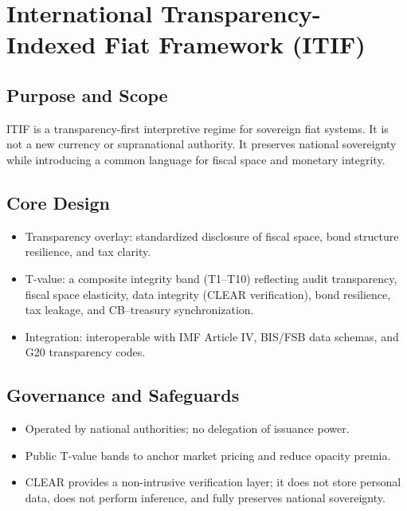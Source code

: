 \section{International Transparency-Indexed Fiat Framework (ITIF)}
\subsection{Purpose and Scope}
ITIF is a transparency-first interpretive regime for sovereign fiat systems. It is not a new currency or supranational authority. It preserves national sovereignty while introducing a common language for fiscal space and monetary integrity.

\subsection{Core Design}
\begin{itemize}
  \item Transparency overlay: standardized disclosure of fiscal space, bond structure resilience, and tax clarity.
  \item T-value: a composite integrity band (T1--T10) reflecting audit transparency, fiscal space elasticity, data integrity (CLEAR verification), bond resilience, tax leakage, and CB--treasury synchronization.
  \item Integration: interoperable with IMF Article IV, BIS/FSB data schemas, and G20 transparency codes.
\end{itemize}

\subsection{Governance and Safeguards}
\begin{itemize}
  \item Operated by national authorities; no delegation of issuance power.
  \item Public T-value bands to anchor market pricing and reduce opacity premia.
  \item CLEAR provides a non-intrusive verification layer; it does not store personal data, does not perform inference, and fully preserves national sovereignty.
\end{itemize}


